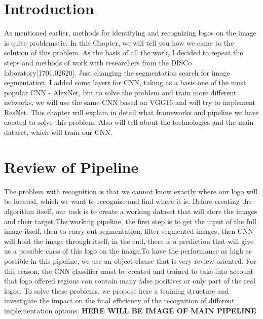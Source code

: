 \section{Introduction}\label{sec:4.1}
\vspace{-0.5cm}
\noindent As mentioned earlier, methods for identifying and recognizing logos on the image is quite problematic. In this Chapter, we will tell you how we came to the solution of this problem. As the basis of all the work, I decided to repeat the steps and methods of work with researchers from the DISCo laboratory[1701.02620]. Just changing the segmentation search for image segmentation, I added some layers for CNN, taking as a basis one of the most popular CNN - AlexNet, but to solve the problem and train more different networks, we will use the same CNN based on VGG16 and will try to implement ResNet. This chapter will explain in detail what frameworks and pipeline we have created to solve this problem. Also will tell about the technologies and the main dataset, which will train our CNN. 

\vspace{-0.3cm}




\section{Review of Pipeline}\label{sec:4.2}
\vspace{-0.5cm}
\noindent The problem with recognition is that we cannot know exactly where our logo will be located, which we want to recognize and find where it is. Before creating the algorithm itself, our task is to create a working dataset that will store the images and their target.The working pipeline, the first step is to get the input of the full image itself, then to carry out segmentation, filter segmented images, then CNN will hold the image through itself, in the end, there is a prediction that will give us a possible class of this logo on the image.To have the performance as high as possible in this pipeline, we use an object clause that is very review-oriented. For this reason, the CNN classifier must be created and trained to take into account that logo offered regions can contain many false positives or only part of the real logos. To solve these problems, we propose here a training structure and investigate the impact on the final efficiency of the recognition of different implementation options. \textbf{HERE WILL BE IMAGE OF MAIN PIPELINE}

